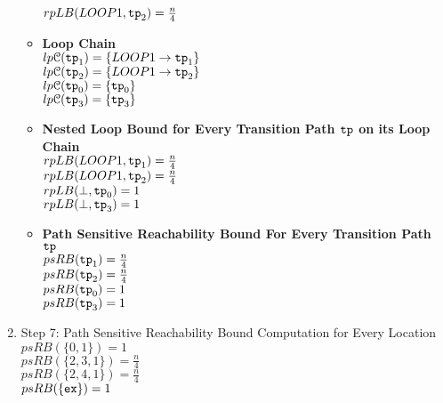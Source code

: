 \begin{example}
\begin{enumerate}
\begin{itemize}
      $rpLB(LOOP1, \mathtt{tp}_2) = \frac{n}{4}$ 
      \item \textbf{Loop Chain}
      \\
      $lp\mathcal{C}(\mathtt{tp}_1) = \{LOOP1\to \mathtt{tp}_1\}$ \\
      $lp\mathcal{C}(\mathtt{tp}_2) = \{LOOP1\to \mathtt{tp}_2\}$ \\
      $lp\mathcal{C}(\mathtt{tp}_0) = \{\mathtt{tp}_0\}$ \\
      $lp\mathcal{C}(\mathtt{tp}_3) = \{\mathtt{tp}_3\}$ 
      \item \textbf{Nested Loop Bound for Every Transition Path $\mathtt{tp}$ on its Loop Chain}
      \\
      $rpLB(LOOP1, \mathtt{tp}_1) = \frac{n}{4}$ \\
      $rpLB(LOOP1, \mathtt{tp}_2) = \frac{n}{4}$  \\
      $rpLB(\bot, \mathtt{tp}_0) = 1$ \\
      $rpLB(\bot, \mathtt{tp}_3) = 1$ 
      \item \textbf{Path Sensitive Reachability Bound For Every Transition Path $\mathtt{tp}$ }
      \\
      $psRB(\mathtt{tp}_1) = \frac{n}{4}$ \\
      $psRB(\mathtt{tp}_2) = \frac{n}{4}$ \\
      $psRB(\mathtt{tp}_0) = 1$ \\
      $psRB(\mathtt{tp}_3) = 1$ 
    \end{itemize}
    \item Step 7: Path Sensitive Reachability Bound Computation for Every Location
    \\
    $psRB(\{0, 1\}) = 1$ \\
    $psRB(\{2, 3, 1 \}) = \frac{n}{4}$ \\
    $psRB(\{2, 4, 1\}) = \frac{n}{4}$ \\
    $psRB(\{\mathtt{ex}\}) = 1$ 
    \end{enumerate}


\end{example}
